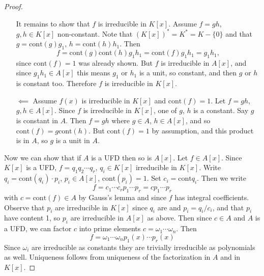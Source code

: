 \begin{proof}
\begin{itemize}
{    It remains to show that $f$ is irreducible in $K[x]$. Assume
    $f = gh$, $g, h \in K[x]$ non-constant. Note that
    $(K[x])^\ast = K^\ast = K - \{ 0 \}$ and that
    $g = \mathrm{cont}(g) g_1$, $h = \mathrm{cont}(h) h_1$. Then
    $$
      f
    = \mathrm{cont}(g)\mathrm{cont}(h) g_1 h_1
    = \mathrm{cont}(f) g_1 h_1
    = g_1 h_1,
    $$
    since $\mathrm{cont}(f) = 1$ was already shown. But $f$ is irreducible
    in $A[x]$, and since $g_1 h_1 \in A[x]$ this means $g_1$ or $h_1$ is a
    unit, so constant, and then $g$ or $h$ is constant too.
    Therefore $f$ is irreducible in $K[x]$.
  }
  \item[$\impliedby$]{
    Assume $f(x)$ is irreducible in $K[x]$ and $\mathrm{cont}(f) = 1$.
    Let $f = gh$, $g, h \in A[x]$. Since $f$ is irreducible in $K[x]$,
    one of $g$, $h$ is a constant. Say $g$ is constant in $A$. Then
    $f = gh$ where $g \in A$, $h \in A[x]$, and so
    $\mathrm{cont}(f) = g \mathrm{cont}(h)$. But $\mathrm{cont}(f) =
    1$ by assumption, and this product is in $A$, so $g$ is a unit in $A$.
  }
\end{itemize}

Now we can show that if $A$ is a UFD then so is $A[x]$. Let
$f \in A[x]$. Since $K[x]$ is a UFD, $f = q_1 q_2 \cdots q_r$,
$q_i \in K[x]$ irreducible in $K[x]$. Write
$q_i = \mathrm{cont}(q_i) \cdot p_i$, $p_i \in A[x]$,
$\mathrm{cont}(p_i) = 1$. Set $c_i = \mathrm{cont}q_i$. Then we write
$$
f = c_1 \cdots c_r p_1 \cdots p_r = c p_1 \cdots p_r
$$
with $c = \mathrm{cont}(f) \in A$ by Gauss's lemma and since $f$ has
integral coefficients.
Observe that $p_i$ are irreducible in $K[x]$ since
$q_i$ are and $p_i = q_i / c_i$, and that $p_i$ have content 1, so
$p_i$ are irreducible in $A[x]$ as above. Then since $c \in A$ and $A$
is a UFD, we can factor $c$ into prime elements $c = \omega_1 \cdots
\omega_n$. Then
$$
f = \omega_1 \cdots \omega_n p_1(x) \cdots p_r(x)
$$
Since $\omega_i$ are irreducible as constants they are trivially
irreducible as polynomials as well. Uniqueness follows from uniqueness
of the factorization in $A$ and in $K[x]$.
\end{proof}

